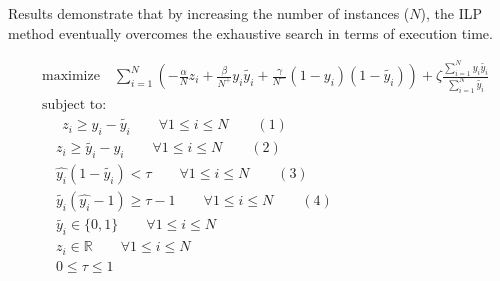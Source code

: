 \documentclass[a4paper]{article}
\begin{document}
Results demonstrate that by increasing the number of instances ($N$), the ILP method eventually overcomes the exhaustive search in terms of execution time.  

\printbibliography

\pagebreak

\begin{equation}
\label{ilp}
\begin{aligned}
&\text{maximize} \quad \sum_{i=1}^{N} \left(-\frac{\alpha}{N}z_i + \frac{\beta}{N^+} y_i \tilde{y_i} + \frac{\gamma}{N^-} (1-y_i) (1-\tilde{y_i})\right) + \zeta \frac{\sum_{i=1}^{N} y_i \tilde{y_i}}{\sum_{i=1}^{N} \tilde{y_i}}\\
&\text{subject to:}\\
&\quad \: \: z_i \ge y_i - \tilde{y_i} \qquad \forall 1\le i \le N \qquad (1)\\
& \quad z_i \ge \tilde{y_i}  - y_i \qquad \forall 1\le i \le N \qquad (2)\\
& \quad \hat{y_i} (1 - \tilde{y_i}) < \tau \qquad \forall 1\le i \le N \qquad (3)\\
& \quad  \tilde{y_i} (\hat{y_i} - 1) \ge \tau - 1 \qquad \forall 1\le i \le N \qquad (4)\\
& \quad \tilde{y_i} \in \{0, 1\} \qquad \forall 1\le i \le N \\
& \quad z_i \in \mathbb{R} \qquad \forall 1\le i \le N \\
& \quad  0 \le \tau \le 1
\end{aligned}
\end{equation}
\end{document}
